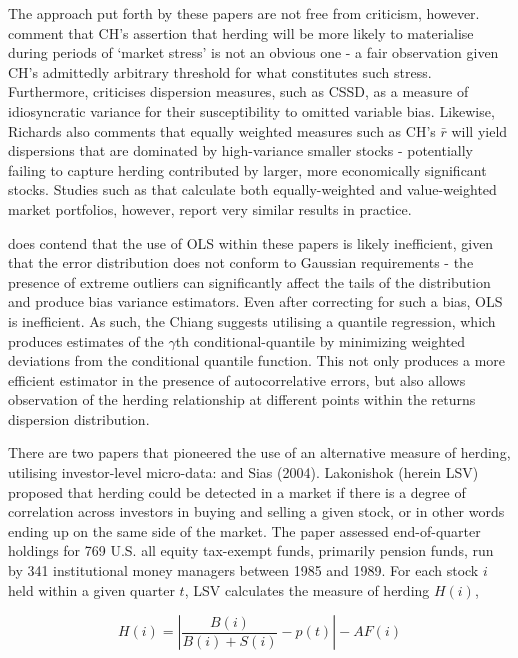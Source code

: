 \documentclass[12pt]{article}
\numberwithin{table}{section}   %
\begin{document}
The approach put forth by these papers are not free from criticism, however. \citet{hirshleifer_review} comment that CH’s assertion that herding will be more likely to materialise during periods of ‘market stress’ is not an obvious one - a fair observation given CH’s admittedly arbitrary threshold for what constitutes such stress. Furthermore, \citet{richards} criticises dispersion measures, such as CSSD, as a measure of idiosyncratic variance for their susceptibility to omitted variable bias. Likewise, Richards also comments that equally weighted measures such as CH’s $\bar{r}$ will yield dispersions that are dominated by high-variance smaller stocks - potentially failing to capture herding contributed by larger, more economically significant stocks. Studies such as \citet{chiang} that calculate both equally-weighted and value-weighted market portfolios, however, report very similar results in practice.

\citet{chiang} does contend that the use of OLS within these papers is likely inefficient, given that the error distribution does not conform to Gaussian requirements - the presence of extreme outliers can significantly affect the tails of the distribution and produce bias variance estimators. Even after correcting for such a bias, OLS is inefficient. As such, the Chiang suggests utilising a quantile regression, which produces estimates of the $\gamma$th conditional-quantile by minimizing weighted deviations from the conditional quantile function. This not only produces a more efficient estimator in the presence of autocorrelative errors, but also allows observation of the herding relationship at different points within the returns dispersion distribution.

There are two papers that pioneered the use of an alternative measure of herding, utilising investor-level micro-data: \citet{lakonishok} and Sias (2004). Lakonishok (herein LSV) proposed that herding could be detected in a market if there is a degree of correlation across investors in buying and selling a given stock, or in other words ending up on the same side of the market. The paper assessed end-of-quarter holdings for 769 U.S. all equity tax-exempt funds, primarily pension funds, run by 341 institutional money managers between 1985 and 1989. For each stock $i$ held within a given quarter $t$, LSV calculates the measure of herding $H(i)$,

$$
H(i)=|\frac{B(i)}{B(i)+S(i)}-p(t)|-AF(i)
$$
\end{document}

